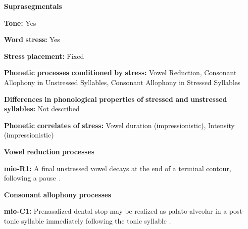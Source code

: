 \begin{styleBody}
\textbf{Suprasegmentals}
\end{styleBody}

\begin{styleBody}
\textbf{Tone:} Yes
\end{styleBody}

\begin{styleBody}
\textbf{Word} \textbf{stress:} Yes
\end{styleBody}

\begin{styleBody}
\textbf{Stress} \textbf{placement:} Fixed
\end{styleBody}

\begin{styleBody}
\textbf{Phonetic} \textbf{processes} \textbf{conditioned} \textbf{by} \textbf{stress:} Vowel Reduction, Consonant Allophony in Unstressed Syllables, Consonant Allophony in Stressed Syllables
\end{styleBody}

\begin{styleBody}
\textbf{Differences} \textbf{in} \textbf{phonological} \textbf{properties} \textbf{of} \textbf{stressed} \textbf{and} \textbf{unstressed} \textbf{syllables:} Not described
\end{styleBody}

\begin{styleBody}
\textbf{Phonetic} \textbf{correlates} \textbf{of} \textbf{stress:} Vowel duration (impressionistic), Intensity (impressionistic)
\end{styleBody}

\begin{styleBody}
\textbf{Vowel} \textbf{reduction} \textbf{processes}
\end{styleBody}

\begin{styleBody}
\textbf{mio-R1:} A final unstressed vowel decays at the end of a terminal contour, following a pause \citep[13]{Bradley1970}.
\end{styleBody}

\begin{styleBody}
\textbf{Consonant} \textbf{allophony} \textbf{processes}
\end{styleBody}

\begin{styleBody}
\textbf{mio-C1:} Prenasalized dental stop may be realized as palato-alveolar in a post-tonic syllable immediately following the tonic syllable \citep[6]{Bradley1970}.
\end{styleBody}

